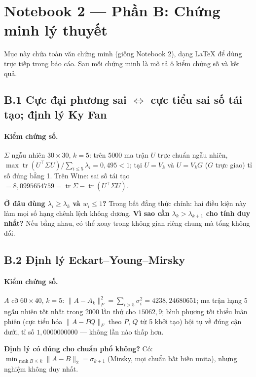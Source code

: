 \documentclass[11pt,a4paper]{article}
\begin{document}
\section{Notebook 2 — Phần B: Chứng minh lý thuyết}
Mục này chứa toàn văn chứng minh (giống Notebook 2), dạng LaTeX để dùng trực tiếp trong báo cáo. Sau mỗi chứng minh là mô tả ô kiểm chứng số và kết quả.



\subsection{B.1 Cực đại phương sai $\Leftrightarrow$ cực tiểu sai số tái tạo; định lý Ky Fan}

\paragraph{Kiểm chứng số.} $\Sigma$ ngẫu nhiên $30\times30$, $k=5$: trên 5000 ma trận $U$ trực chuẩn ngẫu nhiên, $\max\operatorname{tr}(U^\top\Sigma U)/\sum_{i\le5}\lambda_i=0{,}495<1$; tại $U=V_k$ và $U=V_kG$ ($G$ trực giao) tỉ số đúng bằng 1. Trên Wine: sai số tái tạo $=8{,}0995654759=\operatorname{tr}\Sigma-\operatorname{tr}(U^\top\Sigma U)$.
\begin{ask}
\textbf{Ở đâu dùng $\lambda_i\ge\lambda_k$ và $w_i\le1$?} Trong bất đẳng thức chính: hai điều kiện này làm mọi số hạng chênh lệch không dương.
\textbf{Vì sao cần $\lambda_k>\lambda_{k+1}$ cho tính duy nhất?} Nếu bằng nhau, có thể xoay trong không gian riêng chung mà tổng không đổi.
\end{ask}

\subsection{B.2 Định lý Eckart–Young–Mirsky}

\paragraph{Kiểm chứng số.} $A$ cỡ $60\times40$, $k=5$: $\|A-A_k\|_F^2=\sum_{i>5}\sigma_i^2=4238{,}24680651$; ma trận hạng 5 ngẫu nhiên tốt nhất trong 2000 lần thử cho $15062{,}9$; bình phương tối thiểu luân phiên (cực tiểu hóa $\|A-PQ\|_F$ theo $P$, $Q$ từ 5 khởi tạo) hội tụ về đúng cận dưới, tỉ số $1{,}0000000000$ — không lần nào thấp hơn.
\begin{ask}
\textbf{Định lý có đúng cho chuẩn phổ không?} Có: $\min_{\operatorname{rank}B\le k}\|A-B\|_2=\sigma_{k+1}$ (Mirsky, mọi chuẩn bất biến unita), nhưng nghiệm không duy nhất.
\end{ask}
\end{document}

